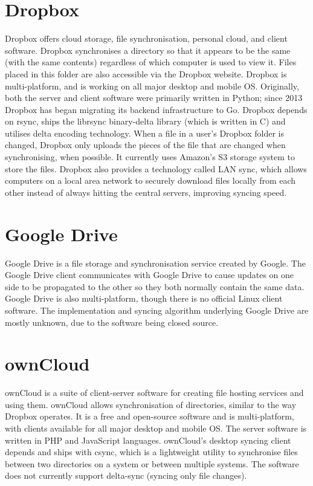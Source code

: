 \section{Dropbox}
  Dropbox offers cloud storage, file synchronisation, personal cloud, and client software. Dropbox synchronises a directory so that it appears to be the same (with the same contents) regardless of which computer is used to view it. Files placed in this folder are also accessible via the Dropbox website. Dropbox is multi-platform, and is working on all major desktop and mobile OS. Originally, both the server and client software were primarily written in Python; since 2013 Dropbox has began migrating its backend infrastructure to Go. Dropbox depends on rsync, ships the librsync binary-delta library (which is written in C) and utilises delta encoding technology. When a file in a user's Dropbox folder is changed, Dropbox only uploads the pieces of the file that are changed when synchronising, when possible. It currently uses Amazon's S3 storage system to store the files. Dropbox also provides a technology called LAN sync, which allows computers on a local area network to securely download files locally from each other instead of always hitting the central servers, improving syncing speed.

\section{Google Drive}
  Google Drive is a file storage and synchronisation service created by Google. The Google Drive client communicates with Google Drive to cause updates on one side to be propagated to the other so they both normally contain the same data. Google Drive is also multi-platform, though there is no official Linux client software. The implementation and syncing algorithm underlying Google Drive are mostly unknown, due to the software being closed source.

\section{ownCloud}
  ownCloud\cite{owncloud} is a suite of client-server software for creating file hosting services and using them. ownCloud allows synchronisation of directories, similar to the way Dropbox operates. It is a free and open-source software and is multi-platform, with clients available for all major desktop and mobile OS. The server software is written in PHP and JavaScript languages. ownCloud's desktop syncing client depends and ships with csync\cite{csync}, which is a lightweight utility to synchronise files between two directories on a system or between multiple systems. The software does not currently support delta-sync (syncing only file changes).



